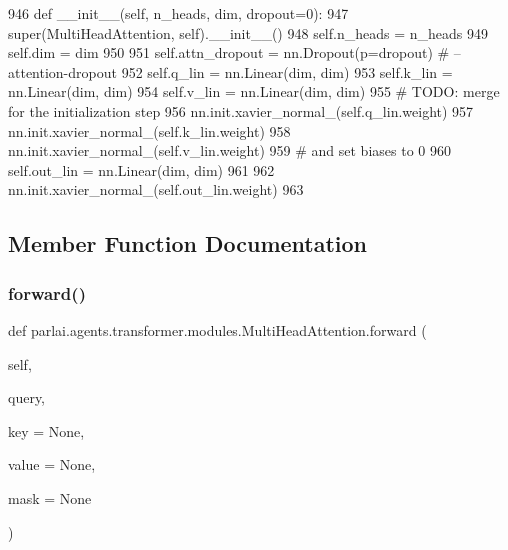 \begin{DoxyCode}
946     \textcolor{keyword}{def }\_\_init\_\_(self, n\_heads, dim, dropout=0):
947         super(MultiHeadAttention, self).\_\_init\_\_()
948         self.n\_heads = n\_heads
949         self.dim = dim
950 
951         self.attn\_dropout = nn.Dropout(p=dropout)  \textcolor{comment}{# --attention-dropout}
952         self.q\_lin = nn.Linear(dim, dim)
953         self.k\_lin = nn.Linear(dim, dim)
954         self.v\_lin = nn.Linear(dim, dim)
955         \textcolor{comment}{# TODO: merge for the initialization step}
956         nn.init.xavier\_normal\_(self.q\_lin.weight)
957         nn.init.xavier\_normal\_(self.k\_lin.weight)
958         nn.init.xavier\_normal\_(self.v\_lin.weight)
959         \textcolor{comment}{# and set biases to 0}
960         self.out\_lin = nn.Linear(dim, dim)
961 
962         nn.init.xavier\_normal\_(self.out\_lin.weight)
963 
\end{DoxyCode}


\subsection{Member Function Documentation}
\mbox{\label{classparlai_1_1agents_1_1transformer_1_1modules_1_1MultiHeadAttention_a0685acda3d791bccfb9a6f4ff2c3680f}} 
\subsubsection{\texorpdfstring{forward()}{forward()}}
{\footnotesize\ttfamily def parlai.\+agents.\+transformer.\+modules.\+Multi\+Head\+Attention.\+forward (\begin{DoxyParamCaption}\item[{}]{self,  }\item[{}]{query,  }\item[{}]{key = {\ttfamily None},  }\item[{}]{value = {\ttfamily None},  }\item[{}]{mask = {\ttfamily None} }\end{DoxyParamCaption})}

